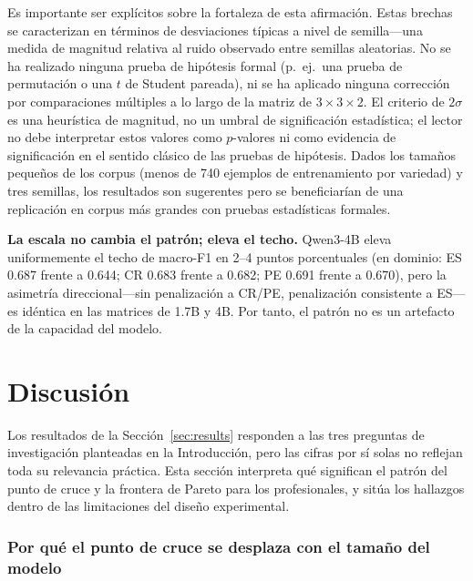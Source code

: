 \documentclass[conference]{IEEEtran}
\begin{document}
Es importante ser explícitos sobre la fortaleza de esta afirmación.
Estas brechas se caracterizan en términos de desviaciones típicas a nivel de
semilla---una medida de magnitud relativa al ruido observado entre semillas
aleatorias.
No se ha realizado ninguna prueba de hipótesis formal (p.\ ej.\ una prueba de
permutación o una $t$ de Student pareada), ni se ha aplicado ninguna corrección
por comparaciones múltiples a lo largo de la matriz de $3\times3\times2$.
El criterio de $2\sigma$ es una heurística de magnitud, no un umbral de
significación estadística; el lector no debe interpretar estos valores como
$p$-valores ni como evidencia de significación en el sentido clásico de las
pruebas de hipótesis.
Dados los tamaños pequeños de los corpus (menos de 740 ejemplos de entrenamiento
por variedad) y tres semillas, los resultados son sugerentes pero se
beneficiarían de una replicación en corpus más grandes con pruebas estadísticas
formales.

\textbf{La escala no cambia el patrón; eleva el techo.}
Qwen3-4B eleva uniformemente el techo de macro-F1 en 2--4 puntos porcentuales
(en dominio: ES 0.687 frente a 0.644; CR 0.683 frente a 0.682; PE 0.691 frente a
0.670), pero la asimetría direccional---sin penalización a CR/PE, penalización
consistente a ES---es idéntica en las matrices de 1.7B y 4B.
Por tanto, el patrón no es un artefacto de la capacidad del modelo.


\section{Discusión}
\label{sec:discussion}

Los resultados de la Sección~\ref{sec:results} responden a las tres preguntas
de investigación planteadas en la Introducción, pero las cifras por sí solas no
reflejan toda su relevancia práctica.
Esta sección interpreta qué significan el patrón del punto de cruce y la
frontera de Pareto para los profesionales, y sitúa los hallazgos dentro de las
limitaciones del diseño experimental.

\subsubsection*{Por qué el punto de cruce se desplaza con el tamaño del modelo}
\end{document}
